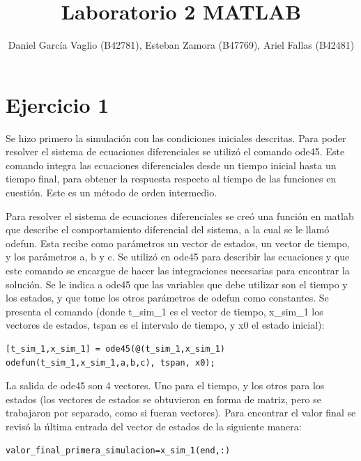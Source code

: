 \documentclass[12pt,letterpaper]{article}
\begin{document}
\title{Laboratorio 2 MATLAB}
\author{Daniel García Vaglio (B42781), Esteban Zamora (B47769), Ariel Fallas (B42481)}
\maketitle

\section{Ejercicio 1} 

Se hizo primero la simulación con las condiciones iniciales descritas. Para poder resolver el sistema de ecuaciones diferenciales se utilizó el comando ode45. Este comando integra las ecuaciones diferenciales desde un tiempo inicial hasta un tiempo final, para obtener la respuesta respecto al tiempo de las funciones en cuestión. Este es un método de orden intermedio. 

Para resolver el sistema de ecuaciones diferenciales se creó una función en matlab que describe el comportamiento diferencial del sistema, a la cual se le llamó odefun. Esta recibe como parámetros un vector de estados, un vector de tiempo, y los parámetros a, b y c. Se utilizó en ode45 para describir las ecuaciones y que este comando se encargue de hacer las integraciones necesarias para encontrar la solución. Se le indica  a ode45 que las variables que debe utilizar son el tiempo y los estados, y que tome los otros parámetros de odefun como constantes. Se presenta el comando (donde t\_sim\_1 es el vector de tiempo, x\_sim\_1 los vectores de estados, tspan es el intervalo de tiempo, y x0 el estado inicial):

\begin{lstlisting}[style=Matlab-editor, basicstyle=\mlttfamily]
    [t_sim_1,x_sim_1] = ode45(@(t_sim_1,x_sim_1) odefun(t_sim_1,x_sim_1,a,b,c), tspan, x0);
\end{lstlisting}

La salida de ode45 son 4 vectores. Uno para el tiempo, y los otros para los estados (los vectores de estados se obtuvieron en forma de matriz, pero se trabajaron por separado, como si fueran vectores). Para encontrar el valor final se revisó la última entrada del vector de estados de la siguiente manera:


\begin{lstlisting}[style=Matlab-editor, basicstyle=\mlttfamily]
    valor_final_primera_simulacion=x_sim_1(end,:)
\end{lstlisting}
\end{document}
